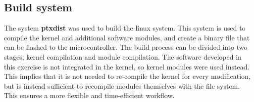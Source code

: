 \subsection{Build system}
The system {\bf ptxdist} was used to build the linux system. This system is used to compile the kernel and additional software modules, and create a binary file that can be flashed to the microcontroller. The build process can be divided into two stages, kernel compilation and module compilation. The software developed in this exercise is not integrated in the kernel, so kernel modules were used instead. This implies that it is not needed to re-compile the kernel for every modification, but is instead sufficient to recompile modules themselves with the file system. This ensures a more flexible and time-efficient workflow.



 